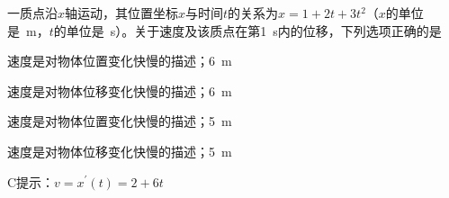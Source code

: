 一质点沿\(x\)轴运动，其位置坐标\(x\)与时间\(t\)的关系为\(x = 1 + 2t + 3t^2\)（\(x\)的单位是\qty{}{m}，\(t\)的单位是\qty{}{s}）。关于速度及该质点在第\qty{1}{s}内的位移，下列选项正确的是\paren[C]
\begin{choices}
    \item 速度是对物体位置变化快慢的描述；\qty{6}{m}
    \item 速度是对物体位移变化快慢的描述；\qty{6}{m}
    \item 速度是对物体位置变化快慢的描述；\qty{5}{m}
    \item 速度是对物体位移变化快慢的描述；\qty{5}{m}
\end{choices}
\begin{answer}
    C\qquad 提示：\(v = x^{\prime}(t) = 2 + 6t\)
\end{answer}